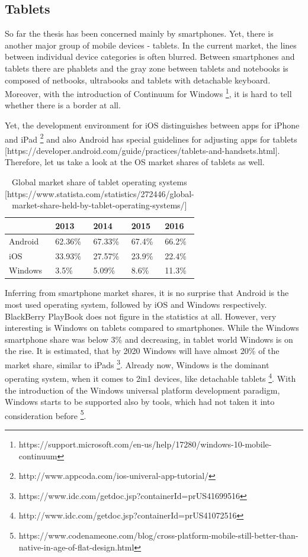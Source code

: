 \documentclass[english,master,public,dept460,male,cpdeclaration,oneside]{diploma}
\begin{document}
\subsection{Tablets}
So far the thesis has been concerned mainly by smartphones. Yet, there is another major group of mobile devices - tablets. In the current market, the lines between individual device categories is often blurred. Between smartphones and tablets there are phablets and the gray zone between tablets and notebooks is composed of netbooks, ultrabooks and tablets with detachable keyboard. Moreover, with the introduction of Continuum for Windows \footnote{https://support.microsoft.com/en-us/help/17280/windows-10-mobile-continuum}, it is hard to tell whether there is a border at all.

Yet, the development environment for iOS distinguishes between apps for iPhone and iPad \footnote{http://www.appcoda.com/ios-univeral-app-tutorial/} and also Android has special guidelines for adjusting apps for tablets [https://developer.android.com/guide/practices/tablets-and-handsets.html]. Therefore, let us take a look at the OS market shares of tablets as well.

\begin{table}
	\centering
	\caption{Global market share of tablet operating systems [https://www.statista.com/statistics/272446/global-market-share-held-by-tablet-operating-systems/]}
	\begin{tabular}{l l l l l}		
		\toprule
		 & 2013 & 2014 & 2015 & 2016 \\
		\midrule
		Android & 62.36\% & 67.33\% & 67.4\% & 66.2\% \\
		iOS & 33.93\% & 27.57\% & 23.9\% & 22.4\% \\
		Windows & 3.5\% & 5.09\% & 8.6\% & 11.3\% \\
		\midrule
	\end{tabular}
\end{table}

Inferring from smartphone market shares, it is no surprise that Android is the most used operating system, followed by iOS and Windows respectively. BlackBerry PlayBook does not figure in the statistics at all. However, very interesting is Windows on tablets compared to smartphones. While the Windows smartphone share was below 3\% and decreasing, in tablet world Windows is on the rise. It is estimated, that by 2020 Windows will have almost 20\% of the market share, similar to iPads \footnote{https://www.idc.com/getdoc.jsp?containerId=prUS41699516}. Already now, Windows is the dominant operating system, when it comes to 2in1 devices, like detachable tablets \footnote{http://www.idc.com/getdoc.jsp?containerId=prUS41072516}. With the introduction of the Windows universal platform development paradigm, Windows starts to be supported also by tools, which had not taken it into consideration before \footnote{https://www.codenameone.com/blog/cross-platform-mobile-still-better-than-native-in-age-of-flat-design.html}. 
\end{document}
